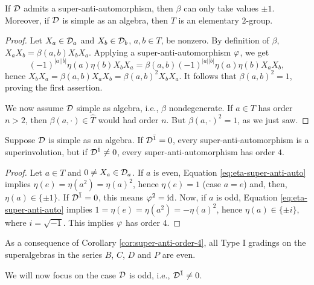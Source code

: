 \documentclass{amsbook}
\begin{document}
\begin{prop}
    If $\mathcal{D}$ admits a super-anti-automorphism, then $\beta$ can only take values $\pm 1$.
    Moreover, if $\mathcal{D}$ is simple as an algebra, then $T$ is an elementary $2$-group.
\end{prop}

\begin{proof}
    Let $X_a\in \mathcal{D}_a$ and $X_b\in \mathcal{D}_b$, $a,b\in T$, be nonzero.
    By definition of $\beta$, $X_a X_b = \beta(a,b) X_b X_a$.
    Applying a super-anti-automorphism $\varphi$, we get \[(-1)^{|a||b|} \eta(a) \eta(b) X_b X_a = \beta(a,b) (-1)^{|a||b|} \eta(a) \eta(b) X_a X_b,\] hence $X_b X_a = \beta(a,b) X_a X_b = \beta(a,b)^2 X_b X_a$.
    It follows that $\beta(a,b)^2 = 1$, proving the first assertion.
    
    We now assume $\mathcal{D}$ simple as algebra, i.e., $\beta$ nondegenerate.
    If $a\in T$ has order $n>2$, then $\beta(a, \cdot)\in \widehat T$ would had order $n$.
    But $\beta(a, \cdot )^2 =1$, as we just saw.
\end{proof}

\begin{cor}\label{cor:super-anti-order-4}
    Suppose $\mathcal{D}$ is simple as an algebra.
    If $\mathcal{D}^{\bar1} = 0$, every super-anti-automorphism is a superinvolution, but if $\mathcal{D}^{\bar1} \neq 0$, every super-anti-automorphism has order $4$.
\end{cor}

\begin{proof}
    Let $a\in T$ and $0 \neq X_a \in \mathcal{D}_a$. If $a$ is even, Equation \eqref{eq:eta-super-anti-auto} implies $\eta(e) = \eta (a^2) = \eta(a)^2$, hence $\eta(e) = 1$ (case $a=e$) and, then,  $\eta(a) \in \{ \pm 1 \}$. If $\mathcal{D}^{\bar1} = 0$, this means $\varphi^2 = \operatorname{id}$. Now, if $a$ is odd, Equation \eqref{eq:eta-super-anti-auto} implies $1 = \eta(e) = \eta (a^2) = - \eta(a)^2$, hence $\eta(a) \in \{ \pm i \}$, where $i = \sqrt{-1}$. This implies $\varphi$ has order $4$.
\end{proof}

As a consequence of Corollary \ref{cor:super-anti-order-4}, all Type I gradings on the superalgebras in the series $B$, $C$, $D$ and $P$ are even.

We will now focus on the case $\mathcal{D}$ is odd, i.e., $\mathcal{D}^{\bar1} \neq 0$.
\end{document}
